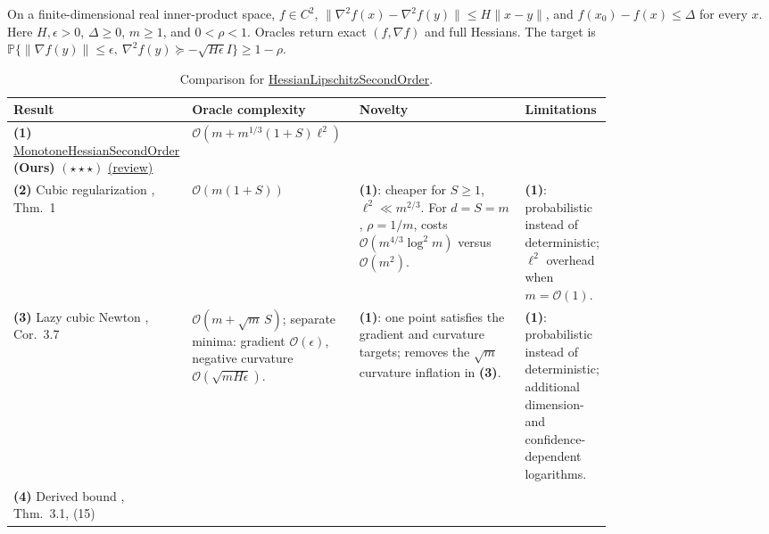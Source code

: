 \begin{table}[tp]
\centering
\caption{Comparison for \href{https://github.com/k3nfalt/longtails/blob/main/LongTails/Setups/HessianLipschitzSecondOrder.lean}{HessianLipschitzSecondOrder}.}\label{tab:HessianLipschitzSecondOrder}
\parbox{\linewidth}{\footnotesize On a finite-dimensional real inner-product space, $f\in C^2$, $\|\nabla^2 f(x)-\nabla^2 f(y)\|\le H\|x-y\|$, and $f(x_0)-f(x)\le\Delta$ for every $x$. Here $H,\epsilon>0$, $\Delta\ge0$, $m\ge1$, and $0<\rho<1$. Oracles return exact $(f,\nabla f)$ and full Hessians. The target is $\mathbb P\{\|\nabla f(y)\|\le\epsilon,\ \nabla^2 f(y)\succeq-\sqrt{H\epsilon}I\}\ge1-\rho$.}\par\smallskip
\begin{threeparttable}
\footnotesize
\setlength{\tabcolsep}{4pt}\renewcommand{\arraystretch}{1.25}
\begin{tabularx}{\linewidth}{@{}>{\raggedright\arraybackslash}p{0.20\linewidth}>{\raggedright\arraybackslash}p{0.29\linewidth}>{\raggedright\arraybackslash}p{0.29\linewidth}>{\raggedright\arraybackslash}X@{}}
\toprule
\textbf{Result} & \textbf{Oracle complexity} & \textbf{Novelty} & \textbf{Limitations} \\
\midrule
\textbf{(1)} \href{https://github.com/k3nfalt/longtails/blob/main/LongTails/Theorems/MonotoneHessianSecondOrder.lean}{Monotone\allowbreak Hessian\allowbreak Second\allowbreak Order} \textbf{(Ours)} $(\star\star\star)$ \href{https://github.com/k3nfalt/longtails/blob/main/scripts/reviews/MonotoneHessianSecondOrder.md}{(review)}
& $\mathcal O\!\left(m+m^{1/3}(1+S)\ell^2\right)$ & & \\
\midrule[1.2pt]
\textbf{(2)} Cubic regularization \citep{hlsNP2006}, Thm.~1
& $\mathcal O\!\left(m(1+S)\right)$
& \textbf{(1)}: cheaper for $S\ge1$, $\ell^2\ll m^{2/3}$. For $d=S=m$, $\rho=1/m$, costs $\mathcal O(m^{4/3}\log^2m)$ versus $\mathcal O(m^2)$.
& \textbf{(1)}: probabilistic instead of deterministic; $\ell^2$ overhead when $m=\mathcal O(1)$. \\
\midrule
\textbf{(3)} Lazy cubic Newton \citep{hlsDCJ2023}, Cor.~3.7
& $\mathcal O(m+\sqrt m\,S)$; separate minima: gradient $\mathcal O(\epsilon)$, negative curvature $\mathcal O(\sqrt{mH\epsilon})$.
& \textbf{(1)}: one point satisfies the gradient and curvature targets; removes the $\sqrt m$ curvature inflation in \textbf{(3)}.
& \textbf{(1)}: probabilistic instead of deterministic; additional dimension- and confidence-dependent logarithms. \\
\midrule
\textbf{(4)} Derived bound \citep{hlsDCJ2023}, Thm.~3.1, (15)

\end{tabularx}
\end{threeparttable}
\end{table}

